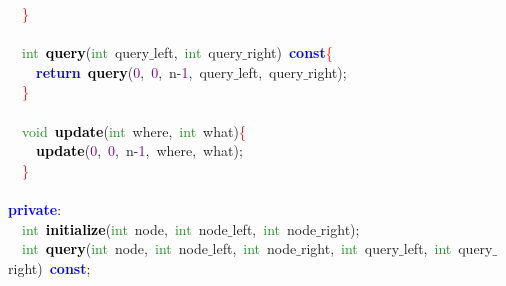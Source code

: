 \mbox{}\ \ \textcolor{Red}{\}} \\
\mbox{} \\
\mbox{}\ \ \textcolor{ForestGreen}{int}\ \textbf{\textcolor{Black}{query}}\textcolor{BrickRed}{(}\textcolor{ForestGreen}{int}\ query$\_$left\textcolor{BrickRed}{,}\ \textcolor{ForestGreen}{int}\ query$\_$right\textcolor{BrickRed}{)}\ \textbf{\textcolor{Blue}{const}}\textcolor{Red}{\{} \\
\mbox{}\ \ \ \ \textbf{\textcolor{Blue}{return}}\ \textbf{\textcolor{Black}{query}}\textcolor{BrickRed}{(}\textcolor{Purple}{0}\textcolor{BrickRed}{,}\ \textcolor{Purple}{0}\textcolor{BrickRed}{,}\ n\textcolor{BrickRed}{-}\textcolor{Purple}{1}\textcolor{BrickRed}{,}\ query$\_$left\textcolor{BrickRed}{,}\ query$\_$right\textcolor{BrickRed}{);} \\
\mbox{}\ \ \textcolor{Red}{\}} \\
\mbox{} \\
\mbox{}\ \ \textcolor{ForestGreen}{void}\ \textbf{\textcolor{Black}{update}}\textcolor{BrickRed}{(}\textcolor{ForestGreen}{int}\ where\textcolor{BrickRed}{,}\ \textcolor{ForestGreen}{int}\ what\textcolor{BrickRed}{)}\textcolor{Red}{\{} \\
\mbox{}\ \ \ \ \textbf{\textcolor{Black}{update}}\textcolor{BrickRed}{(}\textcolor{Purple}{0}\textcolor{BrickRed}{,}\ \textcolor{Purple}{0}\textcolor{BrickRed}{,}\ n\textcolor{BrickRed}{-}\textcolor{Purple}{1}\textcolor{BrickRed}{,}\ where\textcolor{BrickRed}{,}\ what\textcolor{BrickRed}{);} \\
\mbox{}\ \ \textcolor{Red}{\}} \\
\mbox{} \\
\mbox{}\textbf{\textcolor{Blue}{private}}\textcolor{BrickRed}{:} \\
\mbox{}\ \ \textcolor{ForestGreen}{int}\ \textbf{\textcolor{Black}{initialize}}\textcolor{BrickRed}{(}\textcolor{ForestGreen}{int}\ node\textcolor{BrickRed}{,}\ \textcolor{ForestGreen}{int}\ node$\_$left\textcolor{BrickRed}{,}\ \textcolor{ForestGreen}{int}\ node$\_$right\textcolor{BrickRed}{);} \\
\mbox{}\ \ \textcolor{ForestGreen}{int}\ \textbf{\textcolor{Black}{query}}\textcolor{BrickRed}{(}\textcolor{ForestGreen}{int}\ node\textcolor{BrickRed}{,}\ \textcolor{ForestGreen}{int}\ node$\_$left\textcolor{BrickRed}{,}\ \textcolor{ForestGreen}{int}\ node$\_$right\textcolor{BrickRed}{,}\ \textcolor{ForestGreen}{int}\ query$\_$left\textcolor{BrickRed}{,}\ \textcolor{ForestGreen}{int}\ query$\_$right\textcolor{BrickRed}{)}\ \textbf{\textcolor{Blue}{const}}\textcolor{BrickRed}{;} \\
